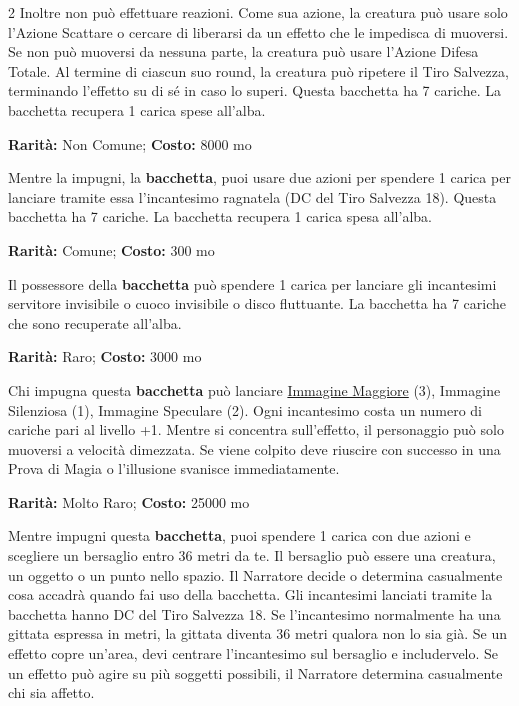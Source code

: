 \begin{multicols}{2}
Inoltre non può effettuare reazioni. Come sua azione, la creatura può usare solo l'Azione Scattare o cercare di liberarsi da un effetto che le impedisca di muoversi. Se non può muoversi da nessuna parte, la creatura può usare l'Azione Difesa Totale. Al termine di ciascun suo round, la creatura può ripetere il Tiro Salvezza, terminando l'effetto su di sé in caso lo superi. Questa bacchetta ha 7 cariche. La bacchetta recupera 1 carica spese all'alba.

\textbf{Rarità:} Non Comune; \textbf{Costo:} 8000 mo

Mentre la impugni, la \textbf{bacchetta}, puoi usare due azioni per spendere 1 carica per lanciare tramite essa l'incantesimo ragnatela (DC del Tiro Salvezza 18). Questa bacchetta ha 7 cariche. La bacchetta recupera 1 carica spesa all'alba.


\textbf{Rarità:} Comune; \textbf{Costo:} 300 mo

Il possessore della \textbf{bacchetta} può spendere 1 carica per lanciare gli incantesimi servitore invisibile o cuoco invisibile o disco fluttuante. La bacchetta ha 7 cariche che sono recuperate all'alba.


\textbf{Rarità:} Raro; \textbf{Costo:} 3000 mo

Chi impugna questa \textbf{bacchetta} può lanciare \hyperlink{Immagine Maggiore}{Immagine Maggiore} (3), Immagine Silenziosa (1), Immagine Speculare (2). Ogni incantesimo costa un numero di cariche pari al livello +1. Mentre si concentra sull'effetto, il personaggio può solo muoversi a velocità dimezzata. Se viene colpito deve riuscire con successo in una Prova di Magia o l'illusione svanisce immediatamente.


\textbf{Rarità:} Molto Raro; \textbf{Costo:} 25000 mo

Mentre impugni questa \textbf{bacchetta}, puoi spendere 1 carica con due azioni e scegliere un bersaglio entro 36 metri da te. Il bersaglio può essere una creatura, un oggetto o un punto nello spazio. Il Narratore decide o determina casualmente cosa accadrà quando fai uso della bacchetta. Gli incantesimi lanciati tramite la bacchetta hanno DC del Tiro Salvezza 18. Se l'incantesimo normalmente ha una gittata espressa in metri, la gittata diventa 36 metri qualora non lo sia già. Se un effetto copre un'area, devi centrare l'incantesimo sul bersaglio e includervelo. Se un effetto può agire su più soggetti possibili, il Narratore determina casualmente chi sia affetto.


\end{multicols}
